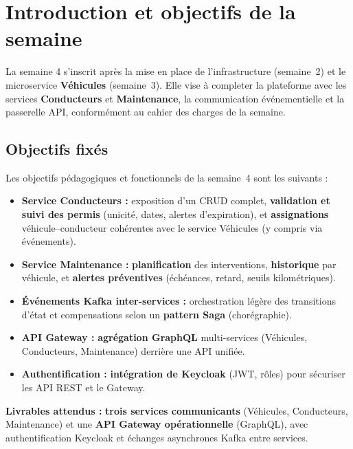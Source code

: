 \documentclass[12pt,a4paper]{article}
\begin{document}
\section{Introduction et objectifs de la semaine}

La semaine 4 s'inscrit après la mise en place de l'infrastructure (semaine~2) et le microservice \textbf{Véhicules} (semaine~3). Elle vise à completer la plateforme avec les services \textbf{Conducteurs} et \textbf{Maintenance}, la communication événementielle et la passerelle API, conformément au cahier des charges de la semaine.

\subsection{Objectifs fixés}

Les objectifs pédagogiques et fonctionnels de la semaine~4 sont les suivants :

\begin{itemize}[leftmargin=*]
  \item \textbf{Service Conducteurs :} exposition d'un CRUD complet, \textbf{validation et suivi des permis} (unicité, dates, alertes d'expiration), et \textbf{assignations} véhicule--conducteur cohérentes avec le service Véhicules (y compris via événements).
  \item \textbf{Service Maintenance :} \textbf{planification} des interventions, \textbf{historique} par véhicule, et \textbf{alertes préventives} (échéances, retard, seuils kilométriques).
  \item \textbf{Événements Kafka inter-services :} orchestration légère des transitions d'état et compensations selon un \textbf{pattern Saga} (chorégraphie).
  \item \textbf{API Gateway :} \textbf{agrégation GraphQL} multi-services (Véhicules, Conducteurs, Maintenance) derrière une API unifiée.
  \item \textbf{Authentification :} \textbf{intégration de Keycloak} (JWT, rôles) pour sécuriser les API REST et le Gateway.
\end{itemize}

\begin{infobox}
\textbf{Livrables attendus :} \textbf{trois services communicants} (Véhicules, Conducteurs, Maintenance) et une \textbf{API Gateway opérationnelle} (GraphQL), avec authentification Keycloak et échanges asynchrones Kafka entre services.
\end{infobox}

\newpage
\end{document}
